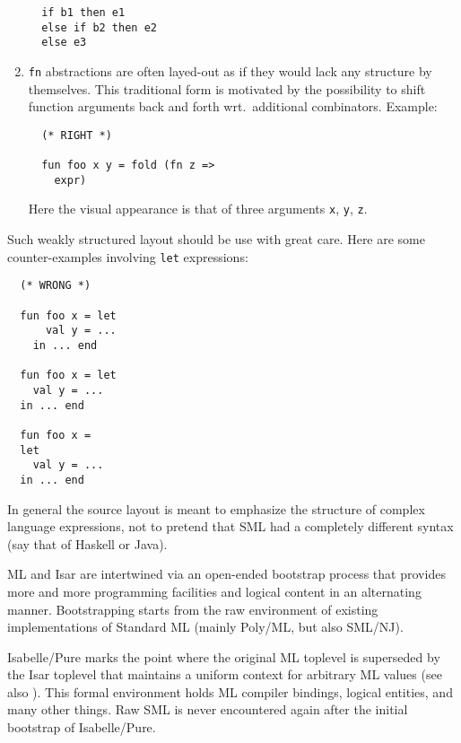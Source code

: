 \begin{isabellebody}
\begin{isamarkuptext}
\begin{enumerate}
\begin{verbatim}
  if b1 then e1
  else if b2 then e2
  else e3
  \end{verbatim}

  \item \verb|fn| abstractions are often layed-out as if they
  would lack any structure by themselves.  This traditional form is
  motivated by the possibility to shift function arguments back and
  forth wrt.\ additional combinators.  Example:

  \begin{verbatim}
  (* RIGHT *)

  fun foo x y = fold (fn z =>
    expr)
  \end{verbatim}

  Here the visual appearance is that of three arguments \verb|x|,
  \verb|y|, \verb|z|.

  \end{enumerate}

  Such weakly structured layout should be use with great care.  Here
  are some counter-examples involving \verb|let| expressions:

  \begin{verbatim}
  (* WRONG *)

  fun foo x = let
      val y = ...
    in ... end

  fun foo x = let
    val y = ...
  in ... end

  fun foo x =
  let
    val y = ...
  in ... end
  \end{verbatim}

  \medskip In general the source layout is meant to emphasize the
  structure of complex language expressions, not to pretend that SML
  had a completely different syntax (say that of Haskell or Java).%
\end{isamarkuptext}%
\isamarkuptrue%
%
\isamarkuptrue%
%
\begin{isamarkuptext}%
ML and Isar are intertwined via an open-ended bootstrap
  process that provides more and more programming facilities and
  logical content in an alternating manner.  Bootstrapping starts from
  the raw environment of existing implementations of Standard ML
  (mainly Poly/ML, but also SML/NJ).

  Isabelle/Pure marks the point where the original ML toplevel is
  superseded by the Isar toplevel that maintains a uniform context for
  arbitrary ML values (see also ).  This formal
  environment holds ML compiler bindings, logical entities, and many
  other things.  Raw SML is never encountered again after the initial
  bootstrap of Isabelle/Pure.


\end{isamarkuptext}
\end{isabellebody}

